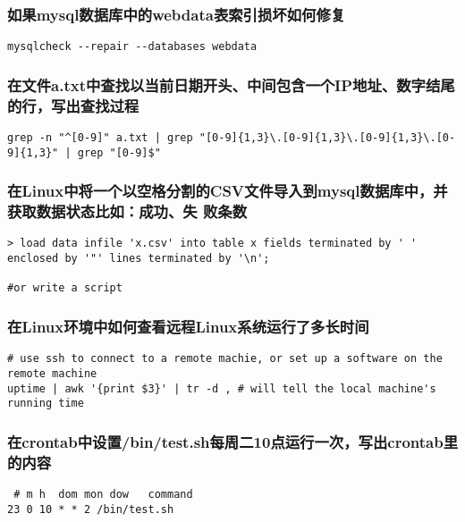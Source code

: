 \documentclass{article}
\begin{document}
\subsubsection{如果mysql数据库中的webdata表索引损坏如何修复}
\begin{verbatim}
mysqlcheck --repair --databases webdata
\end{verbatim}

\subsubsection{在文件a.txt中查找以当前日期开头、中间包含一个IP地址、数字结尾的行，写出查找过程}

\begin{verbatim}
grep -n "^[0-9]" a.txt | grep "[0-9]{1,3}\.[0-9]{1,3}\.[0-9]{1,3}\.[0-9]{1,3}" | grep "[0-9]$"

\end{verbatim}

\subsubsection{在Linux中将一个以空格分割的CSV文件导入到mysql数据库中，并获取数据状态比如：成功、失
败条数}
\begin{verbatim}
> load data infile 'x.csv' into table x fields terminated by ' ' 
enclosed by '"' lines terminated by '\n';

#or write a script
\end{verbatim}

\subsubsection{在Linux环境中如何查看远程Linux系统运行了多长时间}
\begin{verbatim}
# use ssh to connect to a remote machie, or set up a software on the remote machine
uptime | awk '{print $3}' | tr -d , # will tell the local machine's running time

\end{verbatim}

\subsubsection{在crontab中设置/bin/test.sh每周二10点运行一次，写出crontab里的内容}
\begin{verbatim}
 # m h  dom mon dow   command
23 0 10 * * 2 /bin/test.sh

\end{verbatim}
\end{document}
